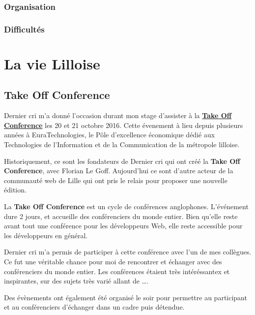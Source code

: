 \subsubsection{Organisation}\label{organisation-1}

\subsubsection{Difficultés}\label{difficultuxe9s-1}

\section{La vie Lilloise}\label{la-vie-lilloise}

\subsection{Take Off Conference}\label{take-off-conference}

\bigskip

Dernier cri m'a donné l'occasion durant mon stage d'assister à la
\href{http://takeoffconf.com/2016}{\textbf{Take Off Conference}} les 20
et 21 octobre 2016. Cette évenement à lieu depuis plusieurs années à
EuraTechnologies, le Pôle d'excellence économique dédié aux Technologies
de l'Information et de la Communication de la métropole lilloise.

\bigskip

Historiquement, ce sont les fondateurs de Dernier cri qui ont créé la
\textbf{Take Off Conference}, avec Florian Le Goff. Aujourd'hui ce sont
d'autre acteur de la communauté web de Lille qui ont pris le relais pour
proposer une nouvelle édition.

\bigskip

La \textbf{Take Off Conference} est un cycle de conférences anglophones.
L'événement dure 2 jours, et accueille des conférenciers du monde
entier. Bien qu'elle reste avant tout une conférence pour les
développeurs Web, elle reste accessible pour les développeurs en
général.

\bigskip

Dernier cri m'a permis de participer à cette conférence avec l'un de mes
collègues. Ce fut une véritable chance pour moi de rencontrer et
échanger avec des conférenciers du monde entier. Les conférences étaient
très intéréssantex et inspirantes, sur des sujets très varié allant de
\ldots{}.

\bigskip

Des évènements ont également été organisé le soir pour permettre au
participant et au conférenciers d'échanger dans un cadre puis détendue.

